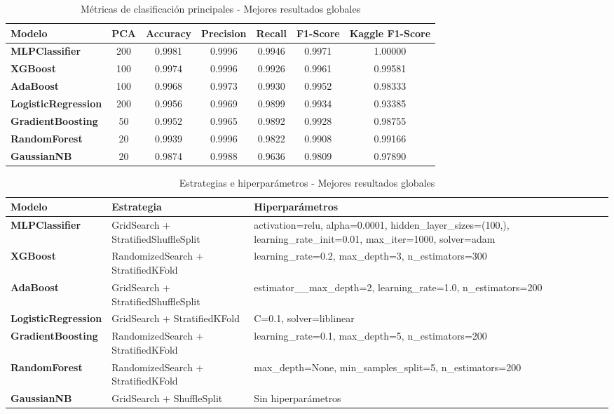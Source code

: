 \documentclass{article}
\begin{document}
\begin{table}[H]
    \centering
    \begin{tabular}{|l|c|c|c|c|c|c|}
    \hline
    \rowcolor{tableblue} \textbf{Modelo} & \textbf{PCA} & \textbf{Accuracy} & \textbf{Precision} & \textbf{Recall} & \textbf{F1-Score} & \textbf{Kaggle F1-Score} \\
    \hline
    \textbf{MLPClassifier} & 200 & 0.9981 & 0.9996 & 0.9946 & 0.9971 & 1.00000 \\
    \hline
    \textbf{XGBoost} & 100 & 0.9974 & 0.9996 & 0.9926 & 0.9961 & 0.99581 \\
    \hline
    \textbf{AdaBoost} & 100 & 0.9968 & 0.9973 & 0.9930 & 0.9952 & 0.98333 \\
    \hline
    \textbf{LogisticRegression} & 200 & 0.9956 & 0.9969 & 0.9899 & 0.9934 & 0.93385 \\
    \hline
    \textbf{GradientBoosting} & 50 & 0.9952 & 0.9965 & 0.9892 & 0.9928 & 0.98755 \\
    \hline
    \textbf{RandomForest} & 20 & 0.9939 & 0.9996 & 0.9822 & 0.9908 & 0.99166 \\
    \hline
    \textbf{GaussianNB} & 20 & 0.9874 & 0.9988 & 0.9636 & 0.9809 & 0.97890 \\
    \hline
    \end{tabular}
    \caption{Métricas de clasificación principales - Mejores resultados globales}
    \label{tab:metricas_globales}
\end{table}

\begin{table}[H]
    \centering
    \begin{tabular}{|l|l|p{4cm}|}
    \hline
    \rowcolor{tableblue} \textbf{Modelo} & \textbf{Estrategia} & \textbf{Hiperparámetros} \\
    \hline
    \textbf{MLPClassifier} & GridSearch + StratifiedShuffleSplit & \small{activation=relu, alpha=0.0001, hidden\_layer\_sizes=(100,), learning\_rate\_init=0.01, max\_iter=1000, solver=adam} \\
    \hline
    \textbf{XGBoost} & RandomizedSearch + StratifiedKFold & \small{learning\_rate=0.2, max\_depth=3, n\_estimators=300} \\
    \hline
    \textbf{AdaBoost} & GridSearch + StratifiedShuffleSplit & \small{estimator\_\_max\_depth=2, learning\_rate=1.0, n\_estimators=200} \\
    \hline
    \textbf{LogisticRegression} & GridSearch + StratifiedKFold & \small{C=0.1, solver=liblinear} \\
    \hline
    \textbf{GradientBoosting} & RandomizedSearch + StratifiedKFold & \small{learning\_rate=0.1, max\_depth=5, n\_estimators=200} \\
    \hline
    \textbf{RandomForest} & RandomizedSearch + StratifiedKFold & \small{max\_depth=None, min\_samples\_split=5, n\_estimators=200} \\
    \hline
    \textbf{GaussianNB} & GridSearch + ShuffleSplit & \small{Sin hiperparámetros} \\
    \hline
    \end{tabular}%
    \caption{Estrategias e hiperparámetros - Mejores resultados globales}
    \label{tab:estrategias_globales}
\end{table}
\end{document}
